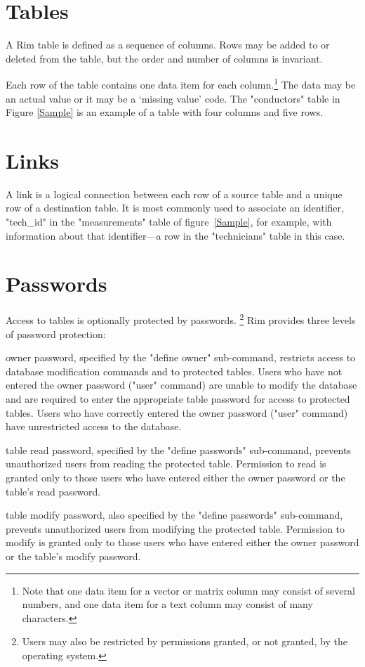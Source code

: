 \section{Tables}
A Rim table is defined as a sequence of columns.
Rows may be added to or deleted from the table, but the
order and number of columns is invariant.
 
Each row of the table contains one data item for each
column.\footnote{Note that one data item for a vector or
matrix column may consist of several numbers, and one data item
for a text column may consist of many characters.}
The data may be an actual value or it may be a `missing value' code.
The "conductors" table in Figure \ref{Sample} is an example
of a table with four columns and five rows.
 
 
 
\section{Links}
A link is a logical connection between
each row of a source table and a unique
row of a destination table.
It is most commonly used to associate an identifier,
"tech_id" in the "measurements" table of
figure~\ref{Sample}, for example,
with information about that identifier---a row in the
"technicians" table in this case.
 
\section{Passwords}
Access to tables is optionally protected by passwords.%
\footnote{Users may also be restricted by permissions granted,
or not granted,
by the operating system.}
Rim provides three levels of password protection:
 
\begin{List}
\item[owner password,] specified by the "define owner" sub-command,
restricts access to database modification commands and to protected
tables.
Users who have not entered the owner password ("user" command)
are unable to modify the database and are required to
enter the appropriate table password for access to
protected tables.
Users who have correctly entered the owner password ("user" command)
have unrestricted access to the database.
\item[table read password,]
specified by the "define passwords" sub-command,
prevents unauthorized users from reading the protected table.
Permission to read is granted only to those users who have entered
either the owner password or the table's read password.
\item[table modify password,] also
specified by the "define passwords" sub-com\-mand,
prevents unauthorized users from modifying the protected table.
Permission to modify is granted only to those users who have entered
either the owner password or the table's modify password.
 
\end{List}
 
